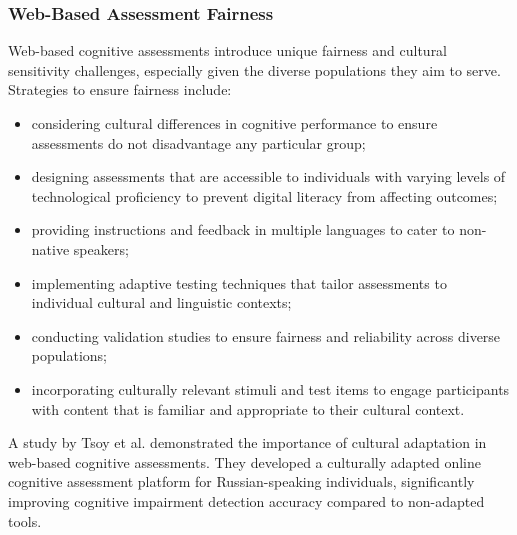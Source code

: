 \subsubsection{Web-Based Assessment Fairness}
Web-based cognitive assessments introduce unique fairness and cultural sensitivity challenges, especially given the diverse populations they aim to serve. Strategies to ensure fairness include:
\begin{itemize}
\item considering cultural differences in cognitive performance to ensure assessments do not disadvantage any particular group;
\item designing assessments that are accessible to individuals with varying levels of technological proficiency to prevent digital literacy from affecting outcomes;
\item providing instructions and feedback in multiple languages to cater to non-native speakers;
\item implementing adaptive testing techniques that tailor assessments to individual cultural and linguistic contexts;
\item conducting validation studies to ensure fairness and reliability across diverse populations;
\item incorporating culturally relevant stimuli and test items to engage participants with content that is familiar and appropriate to their cultural context.
\end{itemize}

A study by Tsoy et al. \cite{Tsoy2019} demonstrated the importance of cultural adaptation in web-based cognitive assessments. They developed a culturally adapted online cognitive assessment platform for Russian-speaking individuals, significantly improving cognitive impairment detection accuracy compared to non-adapted tools.

